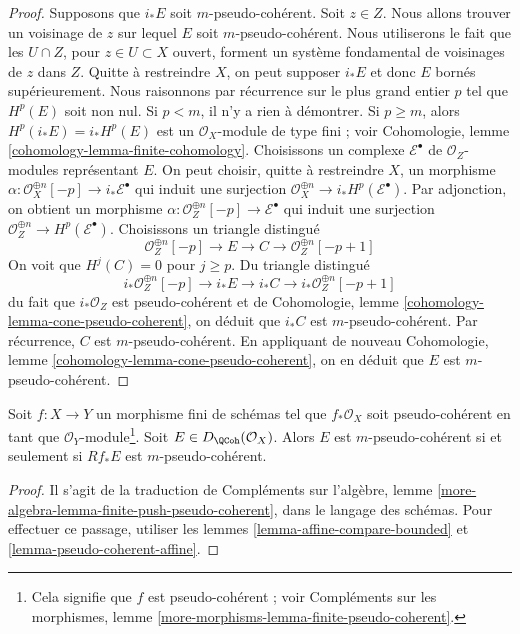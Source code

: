 \begin{proof}
\medskip\noindent
Supposons que $i_*E$ soit $m$-pseudo-cohérent. Soit $z \in Z$.
Nous allons trouver un voisinage de $z$ sur lequel $E$
soit $m$-pseudo-cohérent. Nous utiliserons le fait
que les $U \cap Z$, pour $z \in U \subset X$ ouvert, forment un système fondamental de
voisinages de $z$ dans $Z$. Quitte à restreindre $X$, on peut supposer $i_*E$
et donc $E$ bornés supérieurement. Nous raisonnons par récurrence sur
le plus grand entier $p$ tel que $H^p(E)$ soit non nul. Si $p < m$,
il n'y a rien à démontrer. Si $p \geq m$, alors $H^p(i_*E) = i_*H^p(E)$
est un $\mathcal{O}_X$-module de type fini ; voir
Cohomologie, lemme \ref{cohomology-lemma-finite-cohomology}.
Choisissons un complexe $\mathcal{E}^\bullet$ de $\mathcal{O}_Z$-modules
représentant $E$. On peut choisir, quitte à restreindre $X$,
un morphisme $\alpha : \mathcal{O}_X^{\oplus n}[-p] \to i_*\mathcal{E}^\bullet$
qui induit une surjection
$\mathcal{O}_X^{\oplus n} \to i_*H^p(\mathcal{E}^\bullet)$.
Par adjonction, on obtient un morphisme
$\alpha : \mathcal{O}_Z^{\oplus n}[-p] \to \mathcal{E}^\bullet$
qui induit une surjection
$\mathcal{O}_Z^{\oplus n} \to H^p(\mathcal{E}^\bullet)$.
Choisissons un triangle distingué
$$
\mathcal{O}_Z^{\oplus n}[-p] \to E \to C \to \mathcal{O}_Z^{\oplus n}[-p + 1]
$$
On voit que $H^j(C) = 0$ pour $j \geq p$. Du triangle distingué
$$
i_*\mathcal{O}_Z^{\oplus n}[-p] \to i_*E \to i_*C \to
i_*\mathcal{O}_Z^{\oplus n}[-p + 1]
$$
du fait que $i_*\mathcal{O}_Z$ est pseudo-cohérent
et de
Cohomologie, lemme \ref{cohomology-lemma-cone-pseudo-coherent},
on déduit que $i_*C$ est $m$-pseudo-cohérent.
Par récurrence, $C$ est $m$-pseudo-cohérent.
En appliquant de nouveau Cohomologie, lemme \ref{cohomology-lemma-cone-pseudo-coherent},
on en déduit que $E$ est $m$-pseudo-cohérent.
\end{proof}

\begin{lemma}
\label{lemma-finite-push-pseudo-coherent}
Soit $f : X \to Y$ un morphisme fini de schémas tel que
$f_*\mathcal{O}_X$ soit pseudo-cohérent en tant que
$\mathcal{O}_Y$-module\footnote{Cela signifie que $f$ est pseudo-cohérent ; voir
Compléments sur les morphismes, lemme
\ref{more-morphisms-lemma-finite-pseudo-coherent}.}.
Soit $E \in D_\QCoh(\mathcal{O}_X)$. Alors $E$ est $m$-pseudo-cohérent
si et seulement si $Rf_*E$ est $m$-pseudo-cohérent.
\end{lemma}

\begin{proof}
Il s'agit de la traduction de
Compléments sur l'algèbre, lemme \ref{more-algebra-lemma-finite-push-pseudo-coherent},
dans le langage des schémas. Pour effectuer ce passage, utiliser les
lemmes \ref{lemma-affine-compare-bounded} et
\ref{lemma-pseudo-coherent-affine}.
\end{proof}



